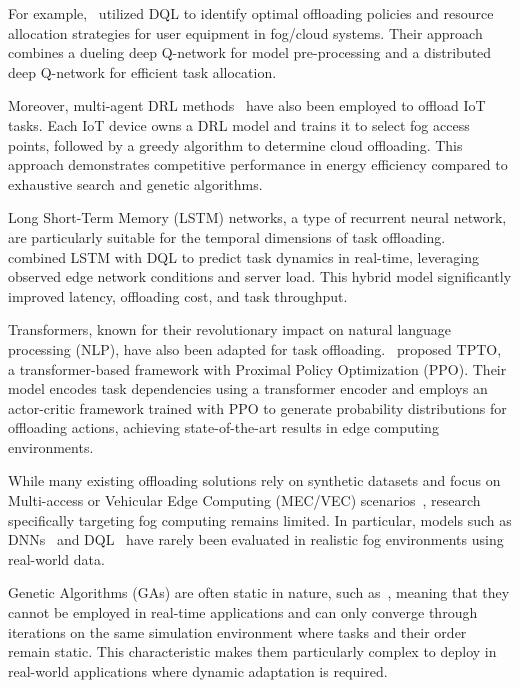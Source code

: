 \documentclass[preprint,3p,authoryear]{elsarticle}
\begin{document}
For example,~\cite{jiang_reinforcement_2021} utilized DQL to identify optimal offloading policies and resource allocation strategies for user equipment in fog/cloud systems. Their approach combines a dueling deep Q-network for model pre-processing and a distributed deep Q-network for efficient task allocation.

Moreover, multi-agent DRL methods~\citep{ren_deep_2021} have also been employed to offload IoT tasks. Each IoT device owns a DRL model and trains it to select fog access points, followed by a greedy algorithm to determine cloud offloading. This approach demonstrates competitive performance in energy efficiency compared to exhaustive search and genetic algorithms.

Long Short-Term Memory (LSTM) networks, a type of recurrent neural network, are particularly suitable for the temporal dimensions of task offloading.~\cite{tu_task_2022} combined LSTM with DQL to predict task dynamics in real-time, leveraging observed edge network conditions and server load. This hybrid model significantly improved latency, offloading cost, and task throughput.

Transformers, known for their revolutionary impact on natural language processing (NLP), have also been adapted for task offloading.~\cite{gholipour_tpto_2023} proposed TPTO, a transformer-based framework with Proximal Policy Optimization (PPO). Their model encodes task dependencies using a transformer encoder and employs an actor-critic framework trained with PPO to generate probability distributions for offloading actions, achieving state-of-the-art results in edge computing environments.

While many existing offloading solutions rely on synthetic datasets and focus on Multi-access or Vehicular Edge Computing (MEC/VEC) scenarios~\citep{fahimullah_review_2022, tu_task_2022, gholipour_tpto_2023}, research specifically targeting fog computing remains limited. In particular, models such as DNNs~\citep{sarkar_deep_2022} and DQL~\citep{jiang_reinforcement_2021} have rarely been evaluated in realistic fog environments using real-world data.

Genetic Algorithms (GAs) are often static in nature, such as~\citet{bernard_d-npga_2024, pakmehr_etfc_2024}, meaning that they cannot be employed in real-time applications and can only converge through iterations on the same simulation environment where tasks and their order remain static. This characteristic makes them particularly complex to deploy in real-world applications where dynamic adaptation is required.
\end{document}
